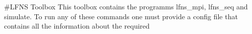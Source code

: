 \#\+L\+F\+NS Toolbox This toolbox contains the programms lfns\+\_\+mpi, lfns\+\_\+seq and simulate. To run any of these commands one must provide a config file that contains all the information about the required ~\newline
 